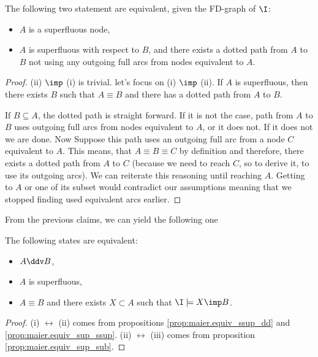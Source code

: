 \begin{proposition} \label{prop:maier.equiv_sup_ssup}
	The following two statement are equivalent, given the FD-graph of $\I$:
	\begin{itemize}
		\item[(i)] $A$ is a superfluous node,
		\item[(ii)] $A$ is superfluous with respect to $B$, and there exists a
		dotted path from $A$ to $B$ not using any outgoing full arcs from nodes
		equivalent to $A$.
	\end{itemize}
	
\end{proposition}

\begin{proof} (ii) $\imp$ (i) is trivial. let's focus on (i) $\imp$ (ii). If 
	$A$ is superfluous, then there exists $B$ such that $A \equiv B$ and there 
	has a dotted path from $A$ to $B$.
	
	\vspace{1.2em}
	
	If $B \subseteq A$, the dotted path is straight forward. If it is not the 
	case, path from $A$ to $B$ uses outgoing full arcs from nodes equivalent to 
	$A$, or it does not. If it does not we are done. Now Suppose this
	path uses an outgoing full arc from a node $C$ equivalent to $A$. This 
	means, that $A \equiv B \equiv C$ by definition and therefore, there exists 
	a
	dotted path from $A$ to $C$ (because we need to reach $C$, so to derive it,
	to use its outgoing arcs). We can reiterate this reasoning until reaching 
	$A$. Getting to $A$ or one of its subset would contradict our assumptions 
	meaning that we stopped finding used equivalent arcs earlier.
	
\end{proof}

From the previous claims, we can yield the following one

\begin{proposition} \label{prop:maier.equiv_sup_dd_sub}
	The following states are equivalent:
	\begin{itemize}
		\item[(i)] $A \ddv B$,
		\item[(ii)] $A$ is superfluous,
		\item[(iii)] $A \equiv B$ and there exists $X \subset A$ such that $\I 
		\models X \imp B$.
	\end{itemize}
\end{proposition}

\begin{proof} (i) $\longleftrightarrow$ (ii) comes from propositions 
	\ref{prop:maier.equiv_ssup_dd} and \ref{prop:maier.equiv_sup_ssup}. (ii) 
	$\longleftrightarrow$ (iii) comes from proposition 
	\ref{prop:maier.equiv_sup_sub}.
	
\end{proof}

